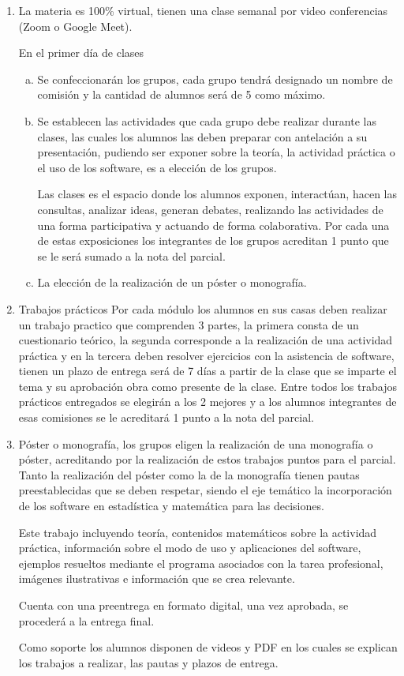 \documentclass[oneside,spanish]{amsart}
\numberwithin{equation}{section}
\numberwithin{figure}{section}
\theoremstyle{definition}
\begin{document}
\begin{enumerate}[1.-]
	\item La materia es 100\% virtual, tienen una clase semanal por video conferencias (Zoom o Google Meet).
	
	En el primer día de clases
	\begin{enumerate}[a.-]
		\item Se confeccionarán los grupos, cada grupo tendrá designado un nombre de comisión y la cantidad de alumnos será de 5 como máximo.
		
		\item Se establecen las actividades que cada grupo debe realizar durante las clases, las cuales los alumnos las deben preparar con antelación a su presentación, pudiendo ser exponer sobre la teoría, la actividad práctica o el uso de los software, es a elección de los grupos. 
		
		Las clases es el espacio donde los alumnos exponen, interactúan, hacen las consultas, analizar ideas, generan debates, realizando las actividades de una forma participativa y actuando de forma colaborativa. 
		Por cada una de estas exposiciones los integrantes de los grupos acreditan 1 punto que se le será sumado a la nota del parcial.
		
		\item La elección de la realización de un póster o monografía.
	\end{enumerate}
	
	\item Trabajos prácticos Por cada módulo los alumnos en sus casas deben realizar un trabajo practico que comprenden 3 partes, la primera consta de un cuestionario teórico, la segunda corresponde a la realización de una actividad práctica y en la tercera deben resolver ejercicios con la asistencia de software, tienen un plazo de entrega será de 7 días a partir de la clase que se imparte el tema y su aprobación obra como presente de la clase.
	Entre todos los trabajos prácticos entregados se elegirán a los 2 mejores y a los alumnos integrantes de esas comisiones se le acreditará 1 punto a la nota del parcial.
	
	\item Póster o monografía, los grupos eligen la realización de una monografía o póster, acreditando por la realización de estos trabajos puntos para el parcial.
	Tanto la realización del póster como la de la monografía tienen pautas preestablecidas que se deben respetar, siendo el eje temático la incorporación de los software en estadística y matemática para las decisiones.
	
	Este trabajo incluyendo teoría, contenidos matemáticos sobre la actividad práctica, información sobre el modo de uso y aplicaciones del software, ejemplos resueltos mediante el programa asociados con la tarea profesional, imágenes ilustrativas e información que se crea relevante.
	
	Cuenta con una preentrega en formato digital, una vez aprobada, se procederá a la entrega final.
	
	Como soporte los alumnos disponen de videos y PDF en los cuales se explican los trabajos a realizar, las pautas y plazos de entrega.
\end{enumerate}
\end{document}
